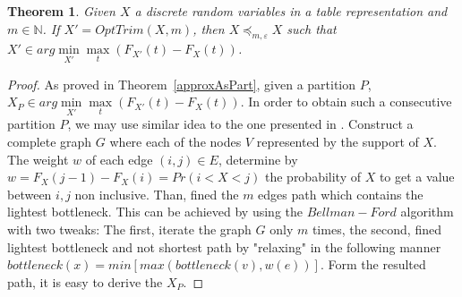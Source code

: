 \documentclass[review]{elsarticle}
\newtheorem{theorem}{Theorem}
\DeclareMathOperator{\support}{support}
\begin{document}
\begin{theorem}
Given $X$ a discrete random variables in a table representation and $m \in \mathbb{N}$. If $X'=OptTrim(X,m)$, then $X\preceq_{m,\varepsilon} X$ such that $X' \in arg\min\limits_{X'} \max\limits_{t} (F_{X'}(t)-F_X(t)) $. 


\end{theorem}
\begin{proof}
As proved in Theorem~\ref{approxAsPart}, given a partition $P$, $X_P \in arg\min\limits_{X'} \max\limits_{t} (F_{X'}(t)-F_X(t)) $. In order to obtain such a consecutive partition $P$, we may use similar idea to the one presented in \cite{chakravarty1982partitioning}. Construct a complete graph $G$ where each of the nodes $V$ represented by the support of $X$. The weight $w$ of each edge $(i,j)\in E$, determine by $w =F_X(j-1)-F_X(i)=Pr(i<X<j)$ the probability of $X$ to get a value between $i,j$ non inclusive. Than, fined the $m$ edges path which contains the lightest bottleneck. This can be achieved by using the $Bellman-Ford$ algorithm with two tweaks: The first, iterate the graph $G$ only $m$ times, the second, fined lightest bottleneck and not shortest path by "relaxing" in the following manner $bottleneck(x) =    min   [max(bottleneck(v),w(e))]$. Form the resulted path, it is easy to derive the $X_P$.
\end{proof}

%
%
\end{document}
